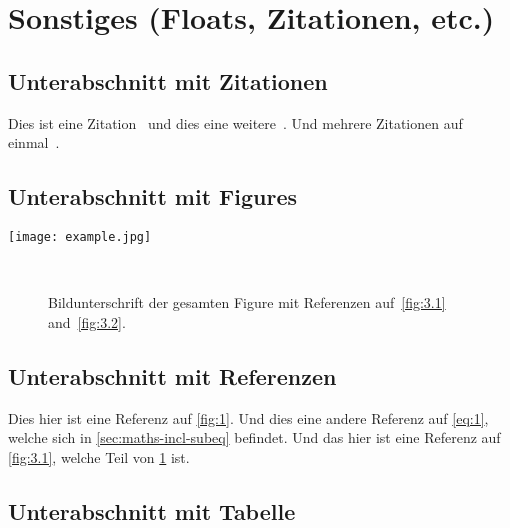 

\section{Sonstiges (Floats, Zitationen, etc.)}


\subsection{Unterabschnitt mit Zitationen}
Dies ist eine Zitation~\cite{D0.ConfNote.5607} und dies eine weitere~\cite{PhysRevLett.100.192004}. Und mehrere Zitationen auf einmal~\cite{PhysRevLett.74.2632, PhysRevLett.100.192004, PhysRevLett.74.2626}.
\blindtext


\subsection{Unterabschnitt mit Figures}
\blindtext
%
\begin{figure*}[t]
  \centering
  \texttt{[image: example.jpg]}
  \caption{\blindtext}
  \label{fig:1}
\end{figure*}
%
\blindtext
%
\begin{figure}[t]
  \centering
  ~
  \caption{Bildunterschrift der gesamten Figure mit Referenzen auf~\cref{fig:3.1} and~\cref{fig:3.2}.}
  \label{fig:3}
\end{figure}
%
\blindtext


\subsection{Unterabschnitt mit Referenzen}
Dies hier ist eine Referenz auf \cref{fig:1}. Und dies eine andere Referenz auf \cref{eq:1}, welche sich in \cref{sec:maths-incl-subeq} befindet. Und das hier ist eine Referenz auf \cref{fig:3.1}, welche Teil von \cref{fig:3} ist. \blindtext


\subsection{Unterabschnitt mit Tabelle}
\blindtext


